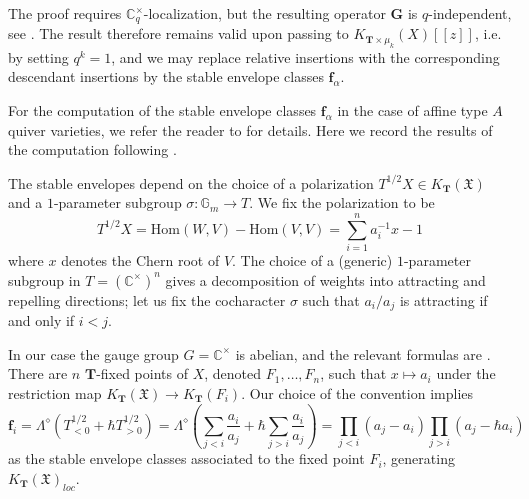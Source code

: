 \documentclass[reqno]{amsart}
\numberwithin{equation}{section}
\numberwithin{equation}{section}
\numberwithin{equation}{section}
\theoremstyle{definition}
\theoremstyle{remark}
\theoremstyle{remark}
\begin{document}
The proof requires $\mathbb{C}^{\times}_q$-localization, but the resulting operator $\mathbf{G}$ is $q$-independent, see \cite[Section 7.1]{Oko17}. The result therefore remains valid upon passing to $K_{\mathbf{T} \times \mu_k}(X) [\![z]\!]$, i.e. by setting $q^k=1$, and we may replace relative insertions with the corresponding descendant insertions by the stable envelope classes $\mathbf{f}_\alpha$.

For the computation of the stable envelope classes $\mathbf{f}_\alpha$ in the case of affine type $A$ quiver varieties, we refer the reader to \cite[Section 3.2]{aganagic-okounkov-bethe} for details. Here we record the results of the computation following \cite{aganagic-okounkov-bethe}. 

The stable envelopes depend on the choice of a polarization $T^{1/2}X \in K_{\mathbf{T}}(\mathfrak{X})$ and a $1$-parameter subgroup $\sigma: \mathbb{G}_m \to T$.  We fix the polarization to be
\begin{equation}
    T^{1/2} X = \mathrm{Hom}(W, V) - \mathrm{Hom}(V,V) =  \sum_{i=1}^n a_i^{-1}x - 1
\end{equation}
where $x$ denotes the Chern root of $V$. The choice of a (generic) $1$-parameter subgroup in $T = (\mathbb{C}^\times)^n$ gives a decomposition of weights into attracting and repelling directions; let us fix the cocharacter $\sigma$ such that $a_i/a_j$ is attracting if and only if $i < j$.

In our case the gauge group $G = \mathbb{C}^\times$ is abelian, and the relevant formulas are \cite[Equation (71, 79)]{aganagic-okounkov-bethe}. There are $n$ $\mathbf{T}$-fixed points of $X$, denoted $F_1, \dots, F_n$, such that $x \mapsto a_i$ under the restriction map $K_\mathbf{T}(\mathfrak{X}) \to K_\mathbf{T}(F_i)$. Our choice of the convention implies
\begin{equation}
    \mathbf{f}_i = \Lambda^{\diamond} \left(T^{1/2}_{<0} + \hbar T^{1/2}_{>0} \right) = \Lambda^\diamond
 \left( \sum_{j<i} \frac{a_i}{a_j} +  \hbar \sum_{j >i} \frac{a_i}{a_j} \right) = \prod_{j<i} (a_j - a_i) \prod_{j>i} (a_j - \hbar a_i) \end{equation}
as the stable envelope classes associated to the fixed point $F_i$, generating $K_\mathbf{T}(\mathfrak{X})_{loc}$.
\end{document}

